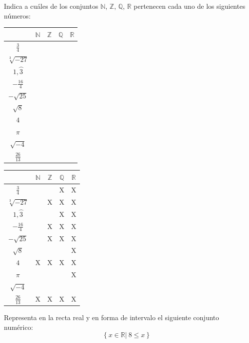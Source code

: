 \documentclass[addpoints,spanish, 12pt,a4paper]{exam}
\begin{document}
\begin{questions}
\addpoints

\question[2] Indica a cuáles de los conjuntos
$\mathbb{N}$, $\mathbb{Z}$, $\mathbb{Q}$, $\mathbb{R}$ pertenecen cada uno de los siguientes números:
\begin{center}
\begin{tabular}{|c |c |c |c |c|}\hline
&$\mathbb{N}$& $\mathbb{Z}$& $\mathbb{Q}$&$\mathbb{R}$\\ 
\hline
$\frac{3}{4}$&&&&\\
\hline
$\sqrt[3]{-27}$&&&&\\
\hline
$1,\wideparen{3}$&&&&\\
\hline
$-\frac{16}{4}$&&&&\\
\hline
$-\sqrt{25}$&&&&\\
\hline
$\sqrt{8}$&&&&\\
\hline
$4$&&&&\\
\hline
$\pi$&&&&\\
\hline
$\sqrt{-4}$&&&&\\
\hline
$\frac{26}{13}$&&&&\\
\hline
\end{tabular}

\end{center}

\begin{solution}
\begin{tabular}{|c |c |c |c |c|}\hline
&$\mathbb{N}$& $\mathbb{Z}$& $\mathbb{Q}$&$\mathbb{R}$\\ 
\hline
$\frac{3}{4}$&&&X&X\\
\hline
$\sqrt[3]{-27}$&&X&X&X\\
\hline
$1,\wideparen{3}$&&&X&X\\
\hline
$-\frac{16}{4}$&&X&X&X\\
\hline
$-\sqrt{25}$&&X&X&X\\
\hline
$\sqrt{8}$&&&&X\\
\hline
$4$&X&X&X&X\\
\hline
$\pi$&&&&X\\
\hline
$\sqrt{-4}$&&&&\\
\hline
$\frac{26}{13}$&X&X&X&X\\
\hline
\end{tabular}
\end{solution}

\addpoints

\question[1] Representa en la recta real y en forma de intervalo el siguiente conjunto numérico:
\addpoints %
$$\left\{ x \in \mathbb{R} \left| \ 8 \leqslant x  \right. \right\}$$


\end{questions}
\end{document}
